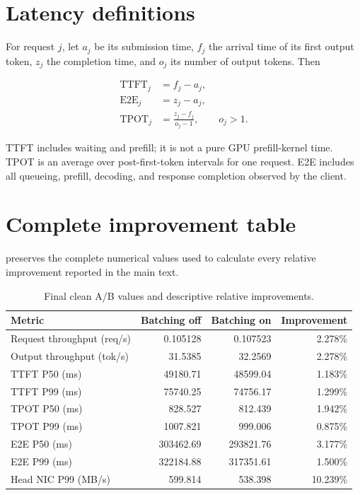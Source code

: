 \label{app:metrics}

\section{Latency definitions}

For request $j$, let $a_j$ be its submission time, $f_j$ the arrival time of
its first output token, $z_j$ the completion time, and $o_j$ its number of
output tokens. Then

\begin{align}
  \mathrm{TTFT}_j &= f_j-a_j,\\
  \mathrm{E2E}_j &= z_j-a_j,\\
  \mathrm{TPOT}_j &= \frac{z_j-f_j}{o_j-1}, \qquad o_j>1.
\end{align}

TTFT includes waiting and prefill; it is not a pure GPU prefill-kernel time.
TPOT is an average over post-first-token intervals for one request. E2E includes
all queueing, prefill, decoding, and response completion observed by the client.

\section{Complete improvement table}

 preserves the complete numerical values used
to calculate every relative improvement reported in the main text.

\begin{table}[H]
  \centering
  \caption{Final clean A/B values and descriptive relative improvements.}
  \label{tab:complete-improvement}
  \begin{tabular}{lrrr}
    \toprule
    Metric & Batching off & Batching on & Improvement \\
    \midrule
    Request throughput (req/s) & 0.105128 & 0.107523 & 2.278\% \\
    Output throughput (tok/s) & 31.5385 & 32.2569 & 2.278\% \\
    TTFT P50 (ms) & 49180.71 & 48599.04 & 1.183\% \\
    TTFT P99 (ms) & 75740.25 & 74756.17 & 1.299\% \\
    TPOT P50 (ms) & 828.527 & 812.439 & 1.942\% \\
    TPOT P99 (ms) & 1007.821 & 999.006 & 0.875\% \\
    E2E P50 (ms) & 303462.69 & 293821.76 & 3.177\% \\
    E2E P99 (ms) & 322184.88 & 317351.61 & 1.500\% \\
    Head NIC P99 (MB/s) & 599.814 & 538.398 & 10.239\% \\
    \bottomrule
  \end{tabular}
\end{table}

